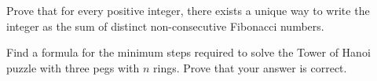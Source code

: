 \documentclass{agony}
\begin{document}

\question Prove that for every positive integer, there exists a unique way to write the integer as the sum of distinct non-consecutive Fibonacci numbers.


\question Find a formula for the minimum steps required to solve the Tower of Hanoi puzzle with three pegs with $n$ rings.
Prove that your answer is correct.
\end{document}

